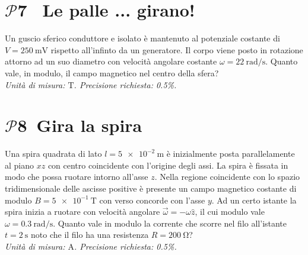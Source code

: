 \documentclass[a4paper,12pt]{article}
\newcommand{\problemtitle}[1]{
  \noindent
  \textbf{\Large #1}\hspace{0.5em}
  \raisebox{0.6ex}{\rule{\linewidth - \widthof{\textbf{\Large #1}} - 0.6em}{0.4pt}}%
}
\begin{document}
\section*{\problemtitle{$\mathcal{P}${\small{7}} \, Le palle ... girano!}}
Un guscio sferico conduttore e isolato è mantenuto al potenziale costante di $V = \SI{250}{\milli\volt}$ rispetto all'infinto da un generatore. Il corpo viene posto in rotazione attorno ad un suo diametro con velocità angolare costante $\omega = \SI{22}{\radian\per\second}$. Quanto vale, in modulo, il campo magnetico nel centro della sfera? \\

\textit{Unità di misura: $\si{\tesla}$. Precisione richiesta: 0.5\%.}


\section*{\problemtitle{$\mathcal{P}${\small{8}}\ Gira la spira}}
\begin{minipage}[c]{0.6\textwidth}
Una spira quadrata di lato $l= \SI{ 5e-2}{\meter}$ è inizialmente posta parallelamente al piano $xz$ con centro coincidente con l'origine degli assi. La spira è fissata in modo che possa ruotare intorno all'asse $z$. Nella regione coincidente con lo spazio tridimensionale delle ascisse positive è presente un campo magnetico costante di modulo $B= \SI{5e-1}{\tesla}$ con verso concorde con l'asse $y$. Ad un certo istante la spira inizia a ruotare con velocità angolare $\vec{\omega} = -\omega \hat{z}$, il cui modulo vale $\omega = \SI{ 0.3}{\radian \per \second}$. Quanto vale in modulo la corrente che scorre nel filo all'istante $t = \SI{2}{\second}$ noto che il filo ha una resistenza $R = \SI{200}{\ohm}$? \\

\textit{Unità di misura: $\si{\ampere}$. Precisione richiesta: 0.5\%.}
\end{minipage}
\hfill
\begin{minipage}[c]{0.35\textwidth}
\begin{center}
\end{center}
\end{minipage}
\end{document}
